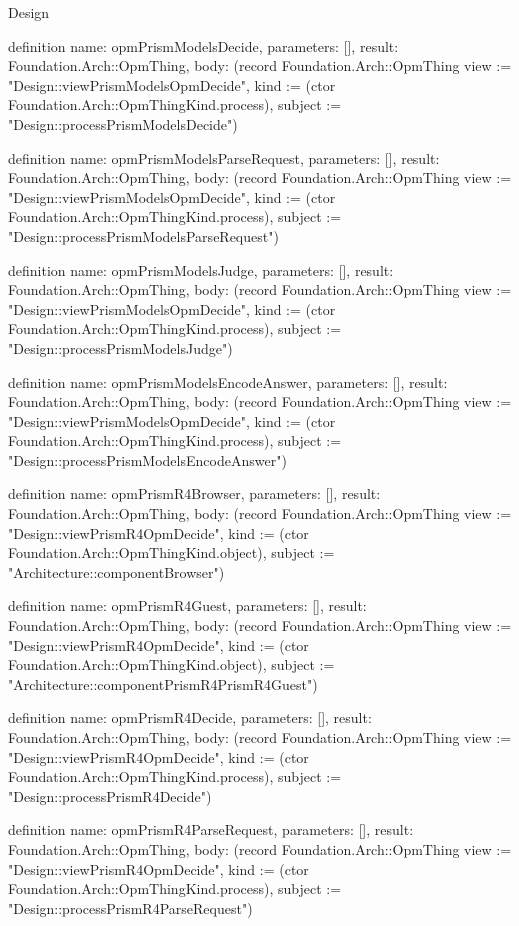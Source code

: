 \begin{lexlean}{Design}
\begin{semanticmodule}
definition{
  name: opmPrismModelsDecide,
  parameters: [],
  result: Foundation.Arch::OpmThing,
  body: (record Foundation.Arch::OpmThing {view := "Design::viewPrismModelsOpmDecide", kind := (ctor Foundation.Arch::OpmThingKind.process), subject := "Design::processPrismModelsDecide"})
}

definition{
  name: opmPrismModelsParseRequest,
  parameters: [],
  result: Foundation.Arch::OpmThing,
  body: (record Foundation.Arch::OpmThing {view := "Design::viewPrismModelsOpmDecide", kind := (ctor Foundation.Arch::OpmThingKind.process), subject := "Design::processPrismModelsParseRequest"})
}

definition{
  name: opmPrismModelsJudge,
  parameters: [],
  result: Foundation.Arch::OpmThing,
  body: (record Foundation.Arch::OpmThing {view := "Design::viewPrismModelsOpmDecide", kind := (ctor Foundation.Arch::OpmThingKind.process), subject := "Design::processPrismModelsJudge"})
}

definition{
  name: opmPrismModelsEncodeAnswer,
  parameters: [],
  result: Foundation.Arch::OpmThing,
  body: (record Foundation.Arch::OpmThing {view := "Design::viewPrismModelsOpmDecide", kind := (ctor Foundation.Arch::OpmThingKind.process), subject := "Design::processPrismModelsEncodeAnswer"})
}

definition{
  name: opmPrismR4Browser,
  parameters: [],
  result: Foundation.Arch::OpmThing,
  body: (record Foundation.Arch::OpmThing {view := "Design::viewPrismR4OpmDecide", kind := (ctor Foundation.Arch::OpmThingKind.object), subject := "Architecture::componentBrowser"})
}

definition{
  name: opmPrismR4Guest,
  parameters: [],
  result: Foundation.Arch::OpmThing,
  body: (record Foundation.Arch::OpmThing {view := "Design::viewPrismR4OpmDecide", kind := (ctor Foundation.Arch::OpmThingKind.object), subject := "Architecture::componentPrismR4PrismR4Guest"})
}

definition{
  name: opmPrismR4Decide,
  parameters: [],
  result: Foundation.Arch::OpmThing,
  body: (record Foundation.Arch::OpmThing {view := "Design::viewPrismR4OpmDecide", kind := (ctor Foundation.Arch::OpmThingKind.process), subject := "Design::processPrismR4Decide"})
}

definition{
  name: opmPrismR4ParseRequest,
  parameters: [],
  result: Foundation.Arch::OpmThing,
  body: (record Foundation.Arch::OpmThing {view := "Design::viewPrismR4OpmDecide", kind := (ctor Foundation.Arch::OpmThingKind.process), subject := "Design::processPrismR4ParseRequest"})
}


\end{semanticmodule}
\end{lexlean}
